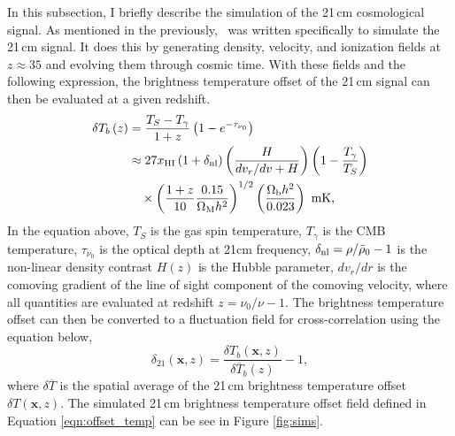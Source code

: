 \label{sec:21cm_temp}

In this subsection, I briefly describe the simulation of the 21\,cm cosmological
signal. As mentioned in the previously, \fastsim\ was written specifically to simulate the 21\,cm
signal. It does this by generating density, velocity, and ionization fields at $z \approx 35$ and evolving
them through cosmic time. With these fields and the following expression, the brightness temperature offset of the
21\,cm signal can then be evaluated at a given redshift.
\begin{align}
  \delta T_b \left(z \right) & = \frac{T_S - T_{\gamma}}{1+z} \left(1 - e^{-\tau_{\nu_0}} \right ) \nonumber \\
      & \approx 27 x_{\rm HI} \left( 1 + \delta_{\rm nl} \right) \left( \frac{H}{dv_r/dv + H}\right) \left( 1 - \frac{T_{\gamma}}{T_S}\right) \nonumber \\
      & \hspace{1em} \times \left( \frac{1 + z}{10} \frac{0.15}{\Omega_{\rm M} h^2} \right)^{1/2} \left( \frac{\Omega_{\rm b} h^2}{0.023} \right) \textrm{ mK,}
      \label{eqn:offset_temp}
\end{align}
In the equation above, $T_S$ is the gas spin temperature, $T_{\gamma}$ is the
CMB temperature, $\tau_{\nu_0}$ is the optical depth at 21cm frequency, $\delta_{\rm nl} = \rho / \bar{\rho}_0 - 1$
is the non-linear density contrast $H \left( z \right)$
is the Hubble parameter, $dv_r / dr$ is the comoving gradient of the line of sight component
of the comoving velocity, where all quantities are evaluated at redshift $z = \nu_0 / \nu - 1$.
The brightness temperature offset can then be converted to a fluctuation field
for cross-correlation using the equation below,
\begin{equation}
\delta_{21} \left( \mathbf{x}, z\right) = \frac{ \delta T_b \left( \mathbf{x}, z\right)}{\delta \overline{T}_b \left( z \right)} - 1,
\end{equation}
where $\delta \overline{T}$ is the spatial average of the 21\,cm brightness temperature offset
$\delta T \left( \mathbf{x}, z\right)$. The simulated 21\,cm brightness temperature offset field defined
in Equation \ref{eqn:offset_temp} can be see in Figure \ref{fig:sims}.
